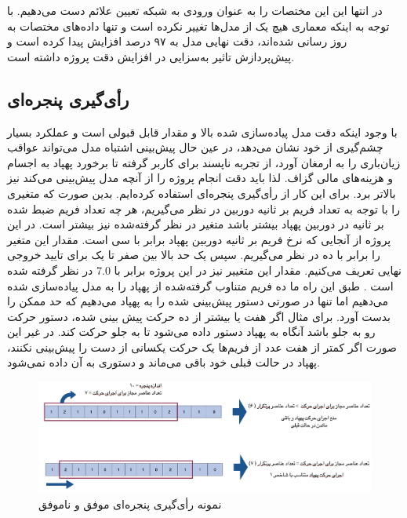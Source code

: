 در انتها این این مختصات را به عنوان ورودی به شبکه تعیین علائم دست می‌دهیم. با توجه به اینکه معماری هیچ یک از مدل‌ها تغییر نکرده است و تنها داده‌های مختصات به روز رسانی شده‌اند، 
دقت نهایی مدل به ۹۷ درصد افزایش پیدا کرده است و پیش‌پردازش تاثیر به‌سزایی در افزایش دقت پروژه داشته است.


\subsection{رأی‌گیری پنجره‌ای}
با وجود اینکه دقت مدل پیاده‌سازی شده بالا و مقدار قابل قبولی است و عملکرد بسیار چشم‌گیری از خود نشان می‌دهد، در عین حال پیش‌بینی اشتباه مدل می‌تواند عواقب زیان‌باری را به ارمغان آورد، 
از تجربه ناپسند برای کاربر گرفته تا برخورد پهپاد به اجسام و هزینه‌های مالی گزاف. لذا باید دقت انجام پروژه را از آنچه مدل پیش‌بینی می‌کند نیز بالاتر برد. برای این کار از رأی‌گیری پنجره‌ای 
استفاده کرده‌ایم. بدین صورت که متغیری را با توجه به تعداد فریم بر ثانیه دوربین در نظر می‌گیریم، هر چه تعداد فریم ضبط شده بر ثانیه در دوربین پهپاد بیشتر باشد متغیر در نظر گرفته‌شده نیز بیشتر 
است. در این پروژه از آنجایی که نرخ فریم بر ثانیه دوربین پهپاد برابر با سی است.  مقدار این متغیر را برابر با ده در نظر می‌گیریم.  سپس یک حد بالا بین صفر تا یک برای تایید خروجی
 نهایی تعریف می‌کنیم. مقدار این متغییر نیز در این پروژه برابر با 7.0 در نظر گرفته شده است . طبق این راه ما ده فریم متناوب گرفته‌شده از پهپاد را به مدل پیاده‌سازی شده می‌دهیم اما تنها در صورتی دستور پیش‌بینی شده را به 
پهپاد می‌دهیم که حد ممکن را بدست آورد. برای مثال اگر هفت یا بیشتر از ده حرکت پیش بینی شده، دستور حرکت رو به جلو باشد آنگاه به پهپاد دستور داده می‌شود تا به جلو حرکت کند. 
در غیر این صورت اگر کمتر از هفت عدد از فریم‌ها یک   حرکت یکسانی از دست را پیش‌بینی نکنند، پهپاد در حالت قبلی خود باقی می‌ماند و دستوری به آن داده نمی‌شود.

\begin{figure}[h]
    \centering
    \includegraphics[width=1\textwidth]{window.png}
    \caption{نمونه رأی‌گیری پنجره‌ای موفق و ناموفق}
\end{figure}

